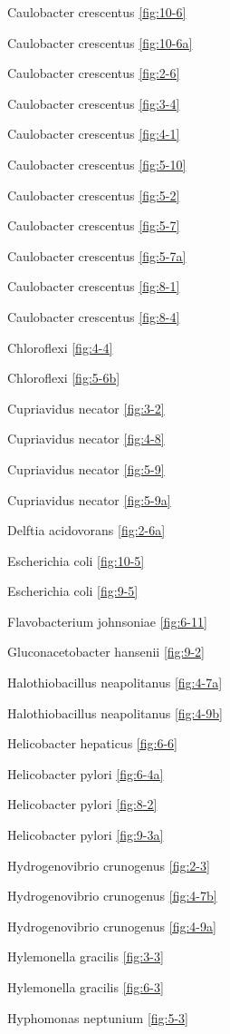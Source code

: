 \documentclass[]{tufte-book}
\begin{document}
Caulobacter crescentus \ref{fig:10-6}

Caulobacter crescentus \ref{fig:10-6a}

Caulobacter crescentus \ref{fig:2-6}

Caulobacter crescentus \ref{fig:3-4}

Caulobacter crescentus \ref{fig:4-1}

Caulobacter crescentus \ref{fig:5-10}

Caulobacter crescentus \ref{fig:5-2}

Caulobacter crescentus \ref{fig:5-7}

Caulobacter crescentus \ref{fig:5-7a}

Caulobacter crescentus \ref{fig:8-1}

Caulobacter crescentus \ref{fig:8-4}

Chloroflexi \ref{fig:4-4}

Chloroflexi \ref{fig:5-6b}

Cupriavidus necator \ref{fig:3-2}

Cupriavidus necator \ref{fig:4-8}

Cupriavidus necator \ref{fig:5-9}

Cupriavidus necator \ref{fig:5-9a}

Delftia acidovorans \ref{fig:2-6a}

Escherichia coli \ref{fig:10-5}

Escherichia coli \ref{fig:9-5}

Flavobacterium johnsoniae \ref{fig:6-11}

Gluconacetobacter hansenii \ref{fig:9-2}

Halothiobacillus neapolitanus \ref{fig:4-7a}

Halothiobacillus neapolitanus \ref{fig:4-9b}

Helicobacter hepaticus \ref{fig:6-6}

Helicobacter pylori \ref{fig:6-4a}

Helicobacter pylori \ref{fig:8-2}

Helicobacter pylori \ref{fig:9-3a}

Hydrogenovibrio crunogenus \ref{fig:2-3}

Hydrogenovibrio crunogenus \ref{fig:4-7b}

Hydrogenovibrio crunogenus \ref{fig:4-9a}

Hylemonella gracilis \ref{fig:3-3}

Hylemonella gracilis \ref{fig:6-3}

Hyphomonas neptunium \ref{fig:5-3}
\end{document}

